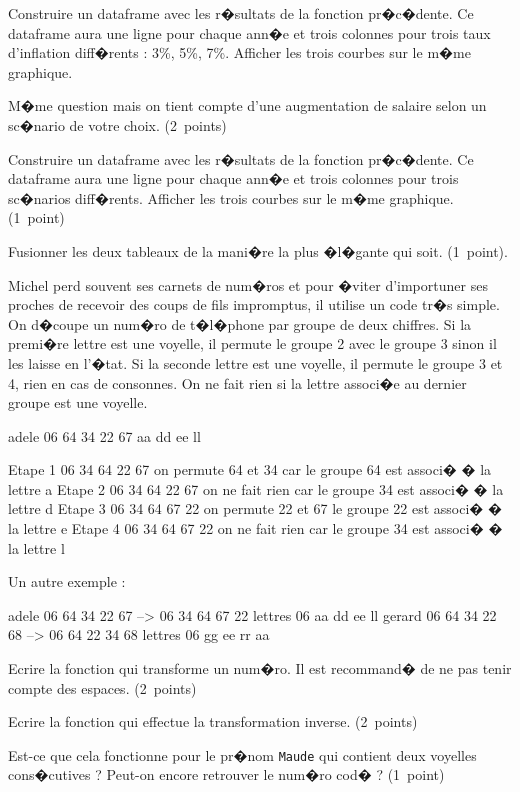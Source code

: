 \begin{xexercice}
\exequest Construire un dataframe avec les r�sultats de la fonction pr�c�dente. Ce dataframe aura une ligne pour chaque ann�e et trois colonnes pour trois taux d'inflation diff�rents : 3\%, 5\%, 7\%. Afficher les trois courbes sur le m�me graphique.

\exequest M�me question mais on tient compte d'une augmentation de salaire selon un sc�nario de votre choix. (2~points)

\exequest Construire un dataframe avec les r�sultats de la fonction pr�c�dente. Ce dataframe aura une ligne pour chaque ann�e et trois colonnes pour trois sc�narios diff�rents. Afficher les trois courbes sur le m�me graphique. (1~point)

\exequest Fusionner les deux tableaux de la mani�re la plus �l�gante qui soit. (1~point).


\end{xexercice}


\newpage 

\exosubject{}
\begin{xexercice}\label{td_note_label6_2016}%


\exequest Michel perd souvent ses carnets de num�ros et pour �viter d'importuner ses proches de recevoir des coups de fils impromptus, il utilise un code tr�s simple. On d�coupe un num�ro de t�l�phone par groupe de deux chiffres. Si la premi�re lettre est une voyelle, il permute le groupe 2 avec le groupe 3 sinon il les laisse en l'�tat. Si la seconde lettre est une voyelle, il permute le groupe 3 et 4, rien en cas de consonnes. On ne fait rien si la lettre associ�e au dernier groupe est une voyelle. 

\begin{verbatimx}
adele   06 64 34 22 67
           aa dd ee ll
					
Etape 1 06 34 64 22 67    on permute 64 et 34 car le groupe 64 est associ� � la lettre a
Etape 2 06 34 64 22 67    on ne fait rien car le groupe 34 est associ� � la lettre d
Etape 3 06 34 64 67 22    on permute 22 et 67 le groupe 22 est associ� � la lettre e
Etape 4 06 34 64 67 22    on ne fait rien car le groupe 34 est associ� � la lettre l
\end{verbatimx}

Un autre exemple :

\begin{verbatimx}
adele   06 64 34 22 67 --> 06 34 64 67 22  lettres 06 aa dd ee ll  
gerard  06 64 34 22 68 --> 06 64 22 34 68  lettres 06 gg ee rr aa
\end{verbatimx}

Ecrire la fonction qui transforme un num�ro. Il est recommand� de ne pas tenir compte des espaces. (2~points)

\exequest Ecrire la fonction qui effectue la transformation inverse. (2~points)


\exequest Est-ce que cela fonctionne pour le pr�nom \texttt{Maude} qui contient deux voyelles cons�cutives ? Peut-on encore retrouver le num�ro cod� ? (1~point)


\end{xexercice}








%
